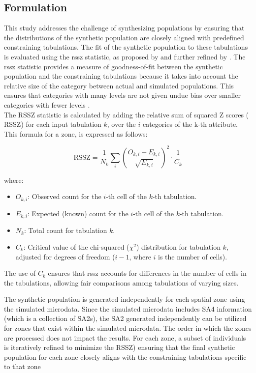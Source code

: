 \subsection{Formulation}
This study addresses the challenge of synthesizing populations by ensuring that the distributions of the synthetic population are closely aligned with predefined constraining tabulations. The fit of the synthetic population to these tabulations is evaluated using the \gls{rssz} statistic, as proposed by \cite{Voas2001EvaluatingMicrodata} and further refined by \cite{Huang2001AMicrodata.}. The \gls{rssz} statistic provides a measure of goodness-of-fit between the synthetic population and the constraining tabulations because it takes into account the relative size of the category between actual and simulated populations. This ensures that categories with many levels are not given undue bias over smaller categories with fewer levels \citep{Rahman2023PopulationTechnique}. 
\\
The RSSZ statistic is calculated by adding the relative sum of squared Z scores (\( \text{RSSZ} \)) for each input tabulation \( k \), over the \(i\) categories of the k-th attribute. This formula for a zone, is expressed as follows:


\[
\text{RSSZ} = \frac{1}{N_k} \sum_{i} \left( \frac{O_{k,i} - E_{k,i}}{\sqrt{E_{k,i}}} \right)^2 \cdot \frac{1}{C_k}
\]

where:
\begin{itemize}
\item \( O_{k,i} \): Observed count for the \( i \)-th cell of the \( k \)-th tabulation.
\item \( E_{k,i} \): Expected (known) count for the \( i \)-th cell of the \( k \)-th tabulation.
\item \( N_k \): Total count for tabulation \( k \).
\item \( C_k \): Critical value of the chi-squared (\( \chi^2 \)) distribution for tabulation \( k \), adjusted for degrees of freedom (\( i-1 \), where \( i \) is the number of cells).

\end{itemize}
The use of \( C_k \) ensures that \gls{rssz} accounts for differences in the number of cells in the tabulations, allowing fair comparisons among tabulations of varying sizes.

The synthetic population is generated independently for each spatial zone using the simulated microdata. Since the simulated microdata includes SA4 information (which is a collection of SA2s), the SA2 generated independently can be utilized for zones that exist within the simulated microdata. The order in which the zones are processed does not impact the results. For each zone, a subset of individuals is iteratively refined to minimize the RSSZ) ensuring that the final synthetic population for each zone closely aligns with the constraining tabulations specific to that zone

